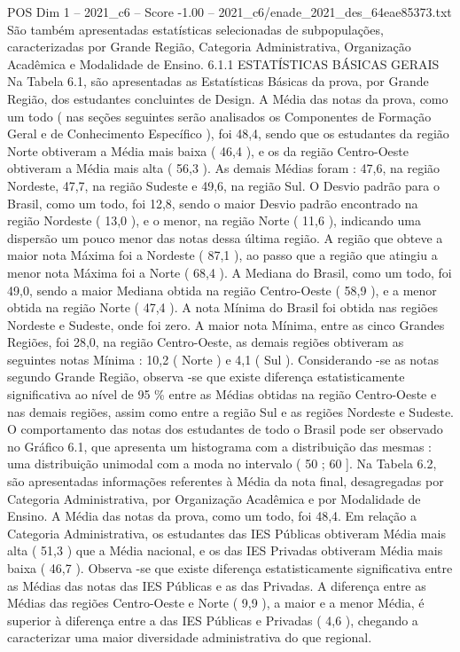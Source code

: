 \begin{textsample}{POS Dim 1 – 2021\_c6 – Score -1.00 – 2021\_c6/enade\_2021\_des\_64eae85373.txt}
São também apresentadas estatísticas selecionadas de subpopulações, caracterizadas por Grande Região, Categoria Administrativa, Organização Acadêmica e Modalidade de Ensino. 6.1.1 ESTATÍSTICAS BÁSICAS GERAIS Na Tabela 6.1, são apresentadas as Estatísticas Básicas da prova, por Grande Região, dos estudantes concluintes de Design.
A Média das notas da prova, como um todo ( nas seções seguintes serão analisados os Componentes de Formação Geral e de Conhecimento Específico ), foi 48,4, sendo que os estudantes da região Norte obtiveram a Média mais baixa ( 46,4 ), e os da região Centro-Oeste obtiveram a Média mais alta ( 56,3 ).
As demais Médias foram : 47,6, na região Nordeste, 47,7, na região Sudeste e 49,6, na região Sul.
O Desvio padrão para o Brasil, como um todo, foi 12,8, sendo o maior Desvio padrão encontrado na região Nordeste ( 13,0 ), e o menor, na região Norte ( 11,6 ), indicando uma dispersão um pouco menor das notas dessa última região.
A região que obteve a maior nota Máxima foi a Nordeste ( 87,1 ), ao passo que a região que atingiu a menor nota Máxima foi a Norte ( 68,4 ).
A Mediana do Brasil, como um todo, foi 49,0, sendo a maior Mediana obtida na região Centro-Oeste ( 58,9 ), e a menor obtida na região Norte ( 47,4 ).
A nota Mínima do Brasil foi obtida nas regiões Nordeste e Sudeste, onde foi zero.
A maior nota Mínima, entre as cinco Grandes Regiões, foi 28,0, na região Centro-Oeste, as demais regiões obtiveram as seguintes notas Mínima : 10,2 ( Norte ) e 4,1 ( Sul ).
Considerando -se as notas segundo Grande Região, observa -se que existe diferença estatisticamente significativa ao nível de 95 \% entre as Médias obtidas na região Centro-Oeste e nas demais regiões, assim como entre a região Sul e as regiões Nordeste e Sudeste.
O comportamento das notas dos estudantes de todo o Brasil pode ser observado no Gráfico 6.1, que apresenta um histograma com a distribuição das mesmas : uma distribuição unimodal com a moda no intervalo ( 50 ; 60 ].
Na Tabela 6.2, são apresentadas informações referentes à Média da nota final, desagregadas por Categoria Administrativa, por Organização Acadêmica e por Modalidade de Ensino.
A Média das notas da prova, como um todo, foi 48,4.
Em relação a Categoria Administrativa, os estudantes das IES Públicas obtiveram Média mais alta ( 51,3 ) que a Média nacional, e os das IES Privadas obtiveram Média mais baixa ( 46,7 ).
Observa -se que existe diferença estatisticamente significativa entre as Médias das notas das IES Públicas e as das Privadas.
A diferença entre as Médias das regiões Centro-Oeste e Norte ( 9,9 ), a maior e a menor Média, é superior à diferença entre a das IES Públicas e Privadas ( 4,6 ), chegando a caracterizar uma maior diversidade administrativa do que regional.

\end{textsample}
